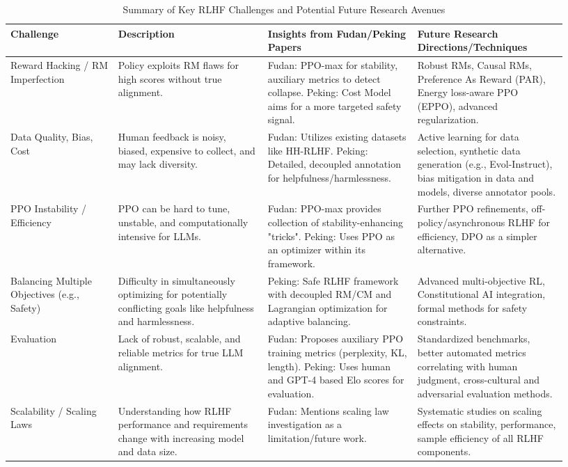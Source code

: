 \documentclass{article} %
\begin{document}
\begin{table*}[htbp]
\centering
\caption{Summary of Key RLHF Challenges and Potential Future Research Avenues}
\label{tab:challenges_future_research}
\begin{tabular}{p{0.18\linewidth} p{0.25\linewidth} p{0.25\linewidth} p{0.25\linewidth}}
\toprule
\textbf{Challenge} & \textbf{Description} & \textbf{Insights from Fudan/Peking Papers} & \textbf{Future Research Directions/Techniques} \\
\midrule
Reward Hacking / RM Imperfection & Policy exploits RM flaws for high scores without true alignment. & Fudan: PPO-max for stability, auxiliary metrics to detect collapse. Peking: Cost Model aims for a more targeted safety signal. & Robust RMs, Causal RMs, Preference As Reward (PAR), Energy loss-aware PPO (EPPO), advanced regularization. \\
\addlinespace
Data Quality, Bias, Cost & Human feedback is noisy, biased, expensive to collect, and may lack diversity. & Fudan: Utilizes existing datasets like HH-RLHF. Peking: Detailed, decoupled annotation for helpfulness/harmlessness. & Active learning for data selection, synthetic data generation (e.g., Evol-Instruct), bias mitigation in data and models, diverse annotator pools. \\
\addlinespace
PPO Instability / Efficiency & PPO can be hard to tune, unstable, and computationally intensive for LLMs. & Fudan: PPO-max provides collection of stability-enhancing "tricks". Peking: Uses PPO as an optimizer within its framework. & Further PPO refinements, off-policy/asynchronous RLHF for efficiency, DPO as a simpler alternative. \\
\addlinespace
Balancing Multiple Objectives (e.g., Safety) & Difficulty in simultaneously optimizing for potentially conflicting goals like helpfulness and harmlessness. & Peking: Safe RLHF framework with decoupled RM/CM and Lagrangian optimization for adaptive balancing. & Advanced multi-objective RL, Constitutional AI integration, formal methods for safety constraints. \\
\addlinespace
Evaluation & Lack of robust, scalable, and reliable metrics for true LLM alignment. & Fudan: Proposes auxiliary PPO training metrics (perplexity, KL, length). Peking: Uses human and GPT-4 based Elo scores for evaluation. & Standardized benchmarks, better automated metrics correlating with human judgment, cross-cultural and adversarial evaluation methods. \\
\addlinespace
Scalability / Scaling Laws & Understanding how RLHF performance and requirements change with increasing model and data size. & Fudan: Mentions scaling law investigation as a limitation/future work. & Systematic studies on scaling effects on stability, performance, sample efficiency of all RLHF components. \\
\bottomrule
\end{tabular}
\end{table*}  
\end{document}
